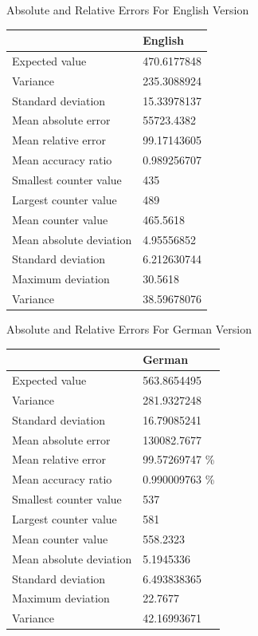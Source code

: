 \documentclass[]{revdetua}
\begin{document}
\begin{table}[!ht]
    \centering
    Absolute and Relative Errors For English Version
    \begin{tabular}{|l|l|}
    \hline
        ~ & English \\ \hline
        Expected value & 470.6177848 \\ \hline
        Variance & 235.3088924 \\ \hline
        Standard deviation & 15.33978137 \\ \hline
        Mean absolute error & 55723.4382 \\ \hline
        Mean relative error & 99.17143605 \\ \hline
        Mean accuracy ratio & 0.989256707 \\ \hline
        Smallest counter value & 435 \\ \hline
        Largest counter value & 489 \\ \hline
        Mean counter value & 465.5618 \\ \hline
        Mean absolute deviation & 4.95556852 \\ \hline
        Standard deviation & 6.212630744 \\ \hline
        Maximum deviation & 30.5618 \\ \hline
        Variance & 38.59678076 \\ \hline
    \end{tabular}
\end{table}

\begin{table}[!ht]
    \centering
    Absolute and Relative Errors For German Version
    \begin{tabular}{|l|l|}
    \hline
        ~ & German \\ \hline
        Expected value & 563.8654495 \\ \hline
        Variance & 281.9327248 \\ \hline
        Standard deviation & 16.79085241 \\ \hline
        Mean absolute error & 130082.7677 \\ \hline
        Mean relative error & 99.57269747 \% \\ \hline
        Mean accuracy ratio & 0.990009763 \% \\ \hline
        Smallest counter value & 537 \\ \hline
        Largest counter value & 581 \\ \hline
        Mean counter value & 558.2323 \\ \hline
        Mean absolute deviation & 5.1945336 \\ \hline
        Standard deviation & 6.493838365 \\ \hline
        Maximum deviation & 22.7677 \\ \hline
        Variance & 42.16993671 \\ \hline
    \end{tabular}
\end{table}
\end{document}
